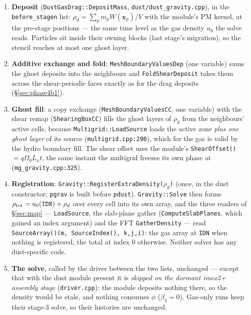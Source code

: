 \documentclass[11pt]{article}
\newcommand{\code}[1]{\texttt{#1}}
\newcommand{\file}[1]{\texttt{\small #1}}
\newcommand{\fn}[1]{\texttt{\small #1}}
\newcommand{\Om}{\Omega_0}
\newcommand{\qom}{q\Om}
\begin{document}
\begin{enumerate}\itemsep3pt
\item \textbf{Deposit} (\fn{DustGasDrag::DepositMass}, \file{dust/dust\_gravity.cpp}),
      in the \code{before\_stagen} list: $\rho_d = \sum_p m_p W(\mathbf x_p)/V$ with the
      module's PM kernel, at the pre-stage positions --- the same time level as the gas
      density $u_0$ the solve reads. Particles sit inside their owning blocks (last
      stage's migration), so the stencil reaches at most one ghost layer.
\item \textbf{Additive exchange and fold}: \code{MeshBoundaryValuesDep} (one variable)
      sums the ghost deposits into the neighbours and \fn{FoldShearDeposit} takes them
      across the shear-periodic faces exactly as for the drag deposits
      (\S\ref{sec:phase4b1}).
\item \textbf{Ghost fill}: a copy exchange (\code{MeshBoundaryValuesCC}, one variable)
      with the shear remap (\code{ShearingBoxCC}) fills the ghost layers of $\rho_d$ from
      the neighbours' active cells, because \fn{Multigrid::LoadSource} loads the active
      zone \emph{plus one ghost layer} of its source (\file{multigrid.cpp:290}), which for
      the gas is valid by the hydro boundary fill. The shear offset uses the module's
      \fn{ShearOffset()} $= \qom L_x t$, the same instant the multigrid freezes its own
      phase at (\file{mg\_gravity.cpp:325}).
\item \textbf{Registration}: \fn{Gravity::RegisterExtraDensity($\rho_d$)} (once, in the
      dust constructor; \code{pgrav} is built before \code{pdust}). \fn{Gravity::Solve}
      then forms $\rho_{\rm tot} = u_0(\code{IDN}) + \rho_d$ over every cell into its own
      array, and the three readers of \S\ref{sec:map} --- \fn{LoadSource}, the slab-plane
      gather (\fn{ComputeSlabPlanes}, which gained an index argument) and the FFT
      \fn{GatherDensity} --- read \fn{SourceArray()(m,\,SourceIndex(),\,k,j,i)}: the gas
      array at \code{IDN} when nothing is registered, the total at index 0 otherwise.
      Neither solver has any dust-specific code.
\item \textbf{The solve}, called by the driver between the two lists, unchanged ---
      except that with the dust module present it is \emph{skipped on the dormant
      imex2+ assembly stage} (\file{driver.cpp}): the module deposits nothing there, so
      the density would be stale, and nothing consumes $\phi$ ($\beta_3 = 0$). Gas-only
      runs keep their stage-3 solve, so their histories are unchanged.

\end{enumerate}
\end{document}
